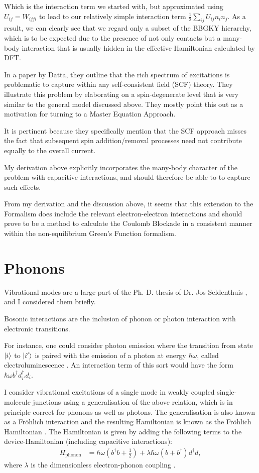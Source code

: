 Which is the interaction term we started with, but approximated using $U_{ij} = W_{ijji}$ to lead to our relatively simple interaction term $\frac{1}{2} \sum_{ij} U_{ij} n_i n_j$. As a result, we can clearly see that we regard only a subset of the BBGKY hierarchy, which is to be expected due to the presence of not only contacts but a many-body interaction that is usually hidden in the effective Hamiltonian calculated by DFT.

In a paper by Datta\cite{mura}, they outline that the rich spectrum of excitations is problematic to capture within any self-consistent field (SCF) theory. They illustrate this problem by elaborating on a spin-degenerate level that is very similar to the general model discussed above. They mostly point this out as a motivation for turning to a Master Equation Approach. 

It is pertinent because they specifically mention that the SCF approach misses the fact that subsequent spin addition/removal processes need not contribute equally to the overall current.

My derivation above explicitly incorporates the many-body character of the problem with capacitive interactions, and should therefore be able to to capture such effects.

From my derivation and the discussion above, it seems that this extension to the Formalism does include the relevant electron-electron interactions and should prove to be a method to calculate the Coulomb Blockade in a consistent manner within the non-equilibrium Green's Function formalism.
\section{Phonons}
\label{sec:phononic}

Vibrational modes are a large part of the Ph. D. thesis of Dr. Jos Seldenthuis \cite{seldenthuis}, and I considered them briefly. 

Bosonic interactions are the inclusion of phonon or photon interaction with electronic transitions.

For instance, one could consider photon emission where the transition from state $\ket{i}$ to $\ket{i'}$ is paired with the emission of a photon at energy $\hbar \omega$, called electroluminescence \cite{electroluminescence}. An interaction term of this sort would have the form $\hbar\omega b^\dagger d_{i'}^\dagger d_i$.

I consider vibrational excitations of a single mode in weakly coupled single-molecule junctions using a generalisation of the above relation, which is in principle correct for phonons as well as photons. The generalisation is also known as a Fr\"ohlich interaction and the resulting Hamiltonian is known as the Fr\"ohlich Hamiltonian \cite{frohlich}. The Hamiltonian is given by adding the following terms to the device-Hamiltonian (including capacitive interactions):
\begin{align}
H_\text{phonon} &= \hbar \omega \left(b^\dagger b + \frac{1}{2}\right) + \lambda \hbar \omega (b + b^\dagger) d^\dagger d, \label{eq:phononhamiltonian}
\end{align}
where $\lambda$ is the dimensionless electron-phonon coupling \cite{kaspermothpoulsen}.

